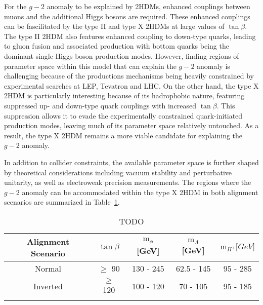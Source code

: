 For the $g-2$ anomaly to be explained by 2HDMs, enhanced couplings between muons and the additional Higgs bosons are required. These enhanced couplings can be fascilitated by the type II and type X 2HDMs at large values of $\tan{\beta}$. The type II 2HDM also features enhanced coupling to down-type quarks, leading to gluon fusion and associated production with bottom quarks being the dominant single Higgs boson production modes. However, finding regions of parameter space within this model that can explain the $g-2$ anomaly is challenging because of the productions mechanisms being heavily constrained by experimental searches at LEP, Tevatron and LHC. On the other hand, the type X 2HDM is particularly interesting because of its hadrophobic nature, featuring suppressed up- and down-type quark couplings with increased $\tan{\beta}$. This suppression allows it to evade the experimentally constrained quark-initiated production modes, leaving much of its parameter space relatively untouched. As a result, the type X 2HDM remains a more viable candidate for explaining the $g-2$ anomaly. 

In addition to collider constraints, the available parameter space is further shaped by theoretical considerations including vacuum stability and perturbative unitarity, as well as electroweak precision measurements. The regions where the $g-2$ anomaly can be accommodated within the type X 2HDM in both alignment scenarios are summarized in Table~\ref{Table:Chapter2_TypeX-ParameterSpace}.

\begin{table}[h]
\centering
\renewcommand{\arraystretch}{1.5} %
\setlength{\tabcolsep}{12pt} %
\begin{tabular}{|c|c|c|c|c|}
\hline
Alignment Scenario & $\tan{\beta}$ & $\text{m}_\phi$ {[}GeV{]} & $\text{m}_A$ {[}GeV{]} & $\text{m}_{H^\pm} {[}GeV{]}$ \\ \hline \hline
Normal             & $\geq$ 90     & 130 - 245                 & 62.5 - 145             & 95 - 285                     \\ \arrayrulecolor{lightgray} \hline
Inverted           & $\geq$ 120    & 100 - 120                 & 70 - 105               & 95 - 185 \\ \arrayrulecolor{black} \hline
\end{tabular}
\caption{TODO}
\label{Table:Chapter2_TypeX-ParameterSpace}
\end{table}

